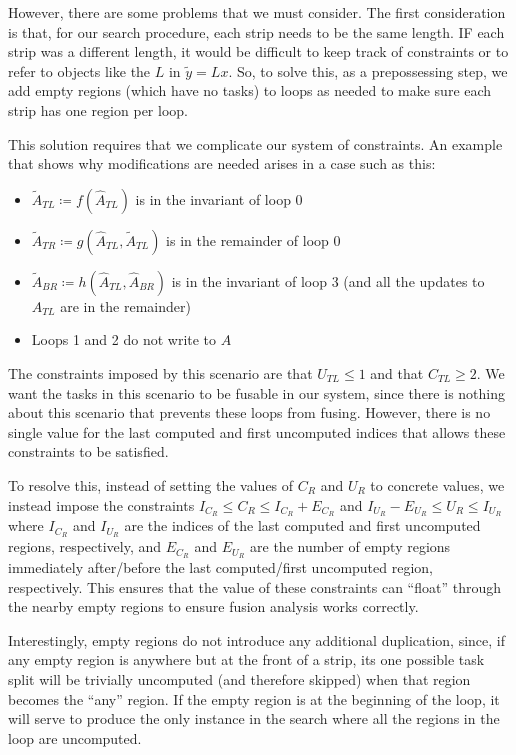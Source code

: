\documentclass[12pt,letterpaper]{article}
\begin{document}
However, there are some problems that we must consider.
The first consideration is that, for our search procedure, each strip needs to be the same length.
IF each strip was a different length, it would be difficult to keep track of constraints or to refer to objects like the $L$ in $\widetilde{y} = Lx$.
So, to solve this, as a prepossessing step, we add empty regions (which have no tasks) to loops as needed to make sure each strip has one region per loop.

This solution requires that we complicate our system of constraints.
An example that shows why modifications are needed arises in a case such as this:
\begin{itemize}
\item $\widetilde{A}_{TL} \coloneqq f(\hat{A}_{TL})$ is in the invariant of loop 0
\item $\widetilde{A}_{TR} \coloneqq g(\hat{A}_{TL}, \widetilde{A}_{TL})$ is in the remainder of loop 0
\item $\widetilde{A}_{BR} \coloneqq h(\hat{A}_{TL}, \hat{A}_{BR})$ is in the invariant of loop 3 (and all the updates to $A_{TL}$ are in the remainder)
\item Loops 1 and 2 do not write to $A$
\end{itemize}
The constraints imposed by this scenario are that $U_{TL} \leq 1$ and that $C_{TL} \geq 2$.
We want the tasks in this scenario to be fusable in our system, since there is nothing about this scenario that prevents these loops from fusing.
However, there is no single value for the last computed and first uncomputed indices that allows these constraints to be satisfied.

To resolve this, instead of setting the values of $C_R$ and $U_R$ to concrete values, we instead impose the constraints $I_{C_R} \leq C_R \leq I_{C_R} + E_{C_R}$ and $I_{U_R} - E_{U_R} \leq U_R \leq I_{U_R}$ where $I_{C_R}$ and $I_{U_R}$ are the indices of the last computed and first uncomputed regions, respectively, and $E_{C_R}$ and $E_{U_R}$ are the number of empty regions immediately after/before the last computed/first uncomputed region, respectively.
This ensures that the value of these constraints can ``float'' through the nearby empty regions to ensure fusion analysis works correctly.

Interestingly, empty regions do not introduce any additional duplication, since, if any empty region is anywhere but at the front of a strip, its one possible task split will be trivially uncomputed (and therefore skipped) when that region becomes the ``any'' region.
If the empty region is at the beginning of the loop, it will serve to produce the only instance in the search where all the regions in the loop are uncomputed.
\end{document}
